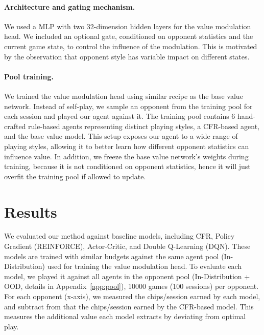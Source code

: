 \documentclass{article}
\begin{document}
\paragraph{Architecture and gating mechanism.}
We used a MLP with two 32-dimension hidden layers for the value modulation head. We included an optional gate, conditioned on opponent statistics and the current game state, to control the influence of the modulation. This is motivated by the observation that opponent style has variable impact on different states.

\paragraph{Pool training.}
We trained the value modulation head using similar recipe as the base value network. Instead of self-play, we sample an opponent from the training pool for each session and played our agent against it. The training pool contains 6 hand-crafted rule-based agents representing distinct playing styles, a CFR-based agent, and the base value model. This setup exposes our agent to a wide range of playing styles, allowing it to better learn how different opponent statistics can influence value. In addition, we freeze the base value network's weights during training, because it is not conditioned on opponent statistics, hence it will just overfit the training pool if allowed to update.

\section{Results}

We evaluated our method against baseline models, including CFR, Policy Gradient (REINFORCE), Actor-Critic, and Double Q-Learning (DQN). These models are trained with similar budgets against the same agent pool (In-Distribution) used for training the value modulation head. To evaluate each model, we played it against all agents in the opponent pool (In-Distribution + OOD, details in Appendix~\ref{app:pool}), 10000 games (100 sessions) per opponent. For each opponent (x-axis), we measured the chips/session earned by each model, and subtract from that the chips/session earned by the CFR-based model. This measures the additional value each model extracts by deviating from optimal play.

\end{document}
